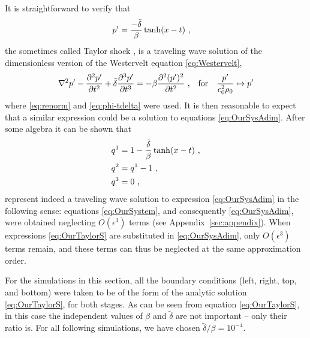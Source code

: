 It is straightforward to verify that
\begin{align*}
  p' &= \frac{-\tilde{\delta}}{\beta} \tanh(x-t) \ \text{,}
\end{align*}
the sometimes called Taylor shock \citep{jordan}, is a traveling wave solution of the dimensionless version of the Westervelt equation \eqref{eq:Westervelt},
\begin{align*}
  \nabla^2 p' 
  - \frac{\partial ^2 p'}{\partial t^2}
  + \tilde{\delta} \frac{\partial ^3 p'}{\partial t^3} 
  =
  -\beta \frac{\partial ^2 (p')^2}{\partial t^2}
  \ \text{,}
  \quad \text{for} \quad \frac{p'}{c_0^2\rho_0} \mapsto p'
\end{align*}
where \eqref{eq:renorm} and \eqref{eq:phi-tdelta} were used.  
It is then reasonable to expect that a similar expression could be a solution to equations \eqref{eq:OurSysAdim}. After some algebra it can be shown that
\begin{subequations}
  \label{eq:OurTaylorS}
  \begin{align}
    q^1 &= 1-\frac{\tilde{\delta}}{\beta}\tanh(x-t) \ \text{,} \\
    q^2 &= q^1 - 1 \ \text{,}\\
    q^3 &= 0 \ \text{,}
  \end{align}
\end{subequations}
represent indeed a traveling wave solution to expression \eqref{eq:OurSysAdim} in the following sense: 
equations \eqref{eq:OurSystem}, and consequently \eqref{eq:OurSysAdim}, were obtained neglecting $O(\epsilon^3)$ terms (see Appendix~\ref{sec:appendix}).
When expressions \eqref{eq:OurTaylorS} are substituted in \eqref{eq:OurSysAdim}, only $O(\epsilon^3)$ terms remain, and these terms can thus be neglected at the same approximation order.

For the simulations in this section, all the boundary conditions (left, right, top, and bottom) were taken to be of the form of the analytic solution \eqref{eq:OurTaylorS}, for both stages. As can be seen from equation \eqref{eq:OurTaylorS}, in this case the independent values of $\beta$ and $\tilde{\delta}$ are not important -- only their ratio is. For all following simulations, we have chosen $\tilde{\delta}/\beta = 10^{-4}$.


